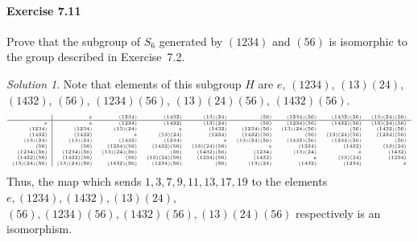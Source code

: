 \documentclass[11pt]{report}
\theoremstyle{remark}
\newtheorem*{solution}{Solution}
\begin{document}
    \paragraph{Exercise 7.11} Prove that the subgroup of $S_6$ generated by $(1234)$
    and $(56)$ is isomorphic to the group described in Exercise~7.2.
    \begin{solution}
        Note that elements of this subgroup $H$ are $e$, $(1234)$, $(13)(24)$,
        $(1432)$, $(56)$, $(1234)(56)$, $(13)(24)(56)$, $(1432)(56)$. \[
        \tiny
        \begin{array}{r|rrrrrrrr}
            & e & (1234) & (1432) & (13)(24) & (56) & (1234)(56) & (1432)(56) &
            (13)(24)(56) \\\hline
        e   & e & (1234) & (1432) & (13)(24) & (56) & (1234)(56) & (1432)(56) &
            (13)(24)(56)\\
        (1234) & (1234) & (13)(24) & e & (1432) & (1234)(56) & (13)(24)(56) & (56) & 
        (1432)(56)\\
        (1432) & (1432) & e & (13)(24) & (1234) & (1432)(56) & (56) & (13)(24)(56)
        & (1234)(56) \\
        (13)(24) & (13)(24) & (1432) & (1234) & e & (13)(24)(56) & (1432)(56) &
        (1234)(56) & (56) \\
        (56)   & (56) & (1234)(56) & (1432)(56) & (13)(24)(56) &e & (1234) & (1432) &
        (13)(24)\\
        (1234)(56) & (1234)(56) & (13)(24)(56) & (56) & (1432)(56) & (1234) &
        (13)(24) & e & (1432)\\
        (1432)(56) & (1432)(56) & (56) & (13)(24)(56) & (1234)(56) & (1432) &e &
        (13)(24) & (1234) \\
        (13)(24)(56) & (13)(24)(56) & (1432)(56) & (1234)(56) & (56) & (13)(24)
        & (1432) & (1234) &e \\
        \end{array}
        \]
        Thus, the map which sends $1, 3, 7, 9, 11, 13, 17, 19$ to the elements $e,
        (1234), (1432), (13)(24)$, $(56), (1234)(56), (1432)(56), (13)(24)(56)$
        respectively is an isomorphism.
    \end{solution}
\end{document}
